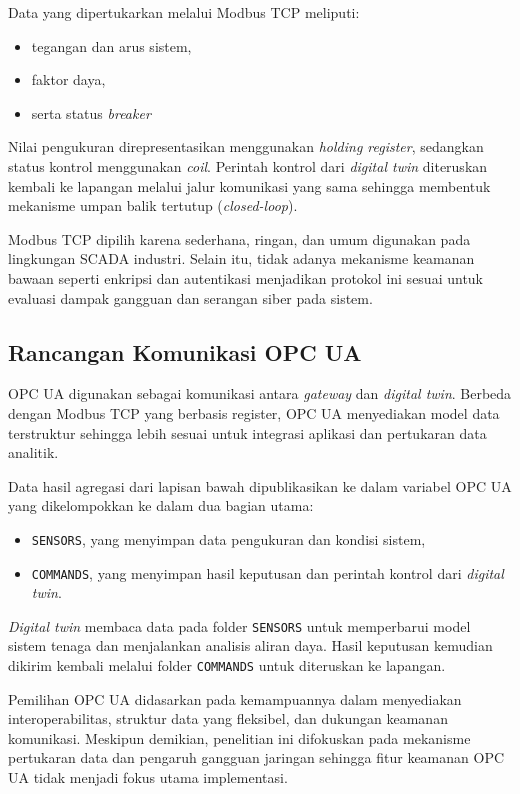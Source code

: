 Data yang dipertukarkan melalui Modbus TCP meliputi:
\begin{itemize}
    \item tegangan dan arus sistem,
    \item faktor daya,
    \item serta status \textit{breaker}
\end{itemize}

Nilai pengukuran direpresentasikan menggunakan \textit{holding register}, sedangkan status kontrol menggunakan \textit{coil}. Perintah kontrol dari \textit{digital twin} diteruskan kembali ke lapangan melalui jalur komunikasi yang sama sehingga membentuk mekanisme umpan balik tertutup (\textit{closed-loop}).

Modbus TCP dipilih karena sederhana, ringan, dan umum digunakan pada lingkungan SCADA industri. Selain itu, tidak adanya mekanisme keamanan bawaan seperti enkripsi dan autentikasi menjadikan protokol ini sesuai untuk evaluasi dampak gangguan dan serangan siber pada sistem.

\subsection{Rancangan Komunikasi OPC UA}
\label{subsec:rancangan_komunikasi_opc_ua}
OPC UA digunakan sebagai komunikasi antara \textit{gateway} dan \textit{digital twin}. Berbeda dengan Modbus TCP yang berbasis register, OPC UA menyediakan model data terstruktur sehingga lebih sesuai untuk integrasi aplikasi dan pertukaran data analitik.

Data hasil agregasi dari lapisan bawah dipublikasikan ke dalam variabel OPC UA yang dikelompokkan ke dalam dua bagian utama:
\begin{itemize}
    \item \texttt{SENSORS}, yang menyimpan data pengukuran dan kondisi sistem,
    \item \texttt{COMMANDS}, yang menyimpan hasil keputusan dan perintah kontrol dari \textit{digital twin}.
\end{itemize}

\textit{Digital twin} membaca data pada folder \texttt{SENSORS} untuk memperbarui model sistem tenaga dan menjalankan analisis aliran daya. Hasil keputusan kemudian dikirim kembali melalui folder \texttt{COMMANDS} untuk diteruskan ke lapangan.

Pemilihan OPC UA didasarkan pada kemampuannya dalam menyediakan interoperabilitas, struktur data yang fleksibel, dan dukungan keamanan komunikasi. Meskipun demikian, penelitian ini difokuskan pada mekanisme pertukaran data dan pengaruh gangguan jaringan sehingga fitur keamanan OPC UA tidak menjadi fokus utama implementasi.

